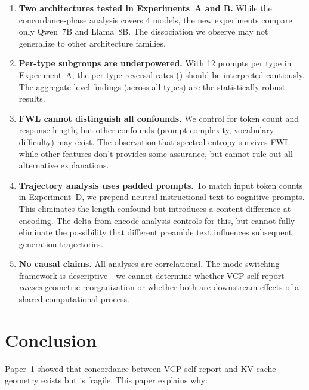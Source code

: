\documentclass[11pt,a4paper]{article}
\begin{document}
\begin{enumerate}
    \item \textbf{Two architectures tested in Experiments~A and B.} While the concordance-phase analysis covers 4 models, the new experiments compare only Qwen~7B and Llama~8B. The dissociation we observe may not generalize to other architecture families.

    \item \textbf{Per-type subgroups are underpowered.} With 12 prompts per type in Experiment~A, the per-type reversal rates () should be interpreted cautiously. The aggregate-level findings (across all types) are the statistically robust results.

    \item \textbf{FWL cannot distinguish all confounds.} We control for token count and response length, but other confounds (prompt complexity, vocabulary difficulty) may exist. The observation that spectral entropy survives FWL while other features don't provides some assurance, but cannot rule out all alternative explanations.

    \item \textbf{Trajectory analysis uses padded prompts.} To match input token counts in Experiment~D, we prepend neutral instructional text to cognitive prompts. This eliminates the length confound but introduces a content difference at encoding. The delta-from-encode analysis controls for this, but cannot fully eliminate the possibility that different preamble text influences subsequent generation trajectories.

    \item \textbf{No causal claims.} All analyses are correlational. The mode-switching framework is descriptive---we cannot determine whether VCP self-report \emph{causes} geometric reorganization or whether both are downstream effects of a shared computational process.
\end{enumerate}

\section{Conclusion}

Paper~1 showed that concordance between VCP self-report and KV-cache geometry exists but is fragile. This paper explains why:
\end{document}
